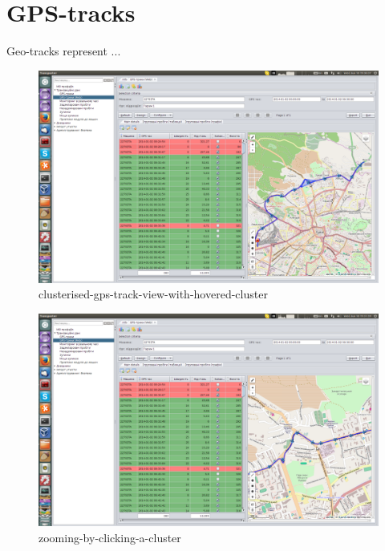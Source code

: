 \section{GPS-tracks}

Geo-tracks represent ...

\begin{figure}[!htp]
\centering
\includegraphics[width=16cm]{chapters/02-gpstracks/images/11-clusterised-gps-track-view-with-hovered-cluster.png}
\caption{clusterised-gps-track-view-with-hovered-cluster}\label{fig:11}
\end{figure}

\begin{figure}[!htp]
\centering
\includegraphics[width=16cm]{chapters/02-gpstracks/images/12-zooming-by-clicking-a-cluster.png}
\caption{zooming-by-clicking-a-cluster}\label{fig:12}
\end{figure}

